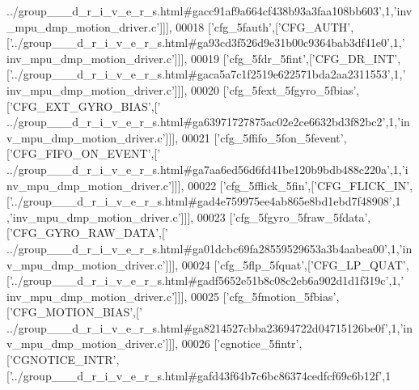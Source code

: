 \begin{DoxyCode}
{      ../group\_\_\_d\_r\_i\_v\_e\_r\_s.html#gacc91af9a664cf438b93a3faa108bb603'},1,\textcolor{stringliteral}{'inv\_mpu\_dmp\_motion\_driver.c'}]]],
00018   [\textcolor{stringliteral}{'cfg\_5fauth'},[\textcolor{stringliteral}{'CFG\_AUTH'},[\textcolor{stringliteral}{'../group\_\_\_d\_r\_i\_v\_e\_r\_s.html#ga93cd3f526d9e31b00c9364bab3df41e0'},1,\textcolor{stringliteral}{'
      inv\_mpu\_dmp\_motion\_driver.c'}]]],
00019   [\textcolor{stringliteral}{'cfg\_5fdr\_5fint'},[\textcolor{stringliteral}{'CFG\_DR\_INT'},[\textcolor{stringliteral}{'../group\_\_\_d\_r\_i\_v\_e\_r\_s.html#gaca5a7c1f2519e622571bda2aa2311553'},1,\textcolor{stringliteral}{'
      inv\_mpu\_dmp\_motion\_driver.c'}]]],
00020   [\textcolor{stringliteral}{'cfg\_5fext\_5fgyro\_5fbias'},[\textcolor{stringliteral}{'CFG\_EXT\_GYRO\_BIAS'},[\textcolor{stringliteral}{'
      ../group\_\_\_d\_r\_i\_v\_e\_r\_s.html#ga63971727875ac02e2ce6632bd3f82bc2'},1,\textcolor{stringliteral}{'inv\_mpu\_dmp\_motion\_driver.c'}]]],
00021   [\textcolor{stringliteral}{'cfg\_5ffifo\_5fon\_5fevent'},[\textcolor{stringliteral}{'CFG\_FIFO\_ON\_EVENT'},[\textcolor{stringliteral}{'
      ../group\_\_\_d\_r\_i\_v\_e\_r\_s.html#ga7aa6ed56d6fd41be120b9bdb488c220a'},1,\textcolor{stringliteral}{'inv\_mpu\_dmp\_motion\_driver.c'}]]],
00022   [\textcolor{stringliteral}{'cfg\_5fflick\_5fin'},[\textcolor{stringliteral}{'CFG\_FLICK\_IN'},[\textcolor{stringliteral}{'../group\_\_\_d\_r\_i\_v\_e\_r\_s.html#gad4e759975ee4ab865e8bd1ebd7f48908'},1
      ,\textcolor{stringliteral}{'inv\_mpu\_dmp\_motion\_driver.c'}]]],
00023   [\textcolor{stringliteral}{'cfg\_5fgyro\_5fraw\_5fdata'},[\textcolor{stringliteral}{'CFG\_GYRO\_RAW\_DATA'},[\textcolor{stringliteral}{'
      ../group\_\_\_d\_r\_i\_v\_e\_r\_s.html#ga01dcbc69fa28559529653a3b4aabea00'},1,\textcolor{stringliteral}{'inv\_mpu\_dmp\_motion\_driver.c'}]]],
00024   [\textcolor{stringliteral}{'cfg\_5flp\_5fquat'},[\textcolor{stringliteral}{'CFG\_LP\_QUAT'},[\textcolor{stringliteral}{'../group\_\_\_d\_r\_i\_v\_e\_r\_s.html#gadf5652e51b8c08c2eb6a902d1d1f319c'},1,\textcolor{stringliteral}{'
      inv\_mpu\_dmp\_motion\_driver.c'}]]],
00025   [\textcolor{stringliteral}{'cfg\_5fmotion\_5fbias'},[\textcolor{stringliteral}{'CFG\_MOTION\_BIAS'},[\textcolor{stringliteral}{'
      ../group\_\_\_d\_r\_i\_v\_e\_r\_s.html#ga8214527cbba23694722d04715126be0f'},1,\textcolor{stringliteral}{'inv\_mpu\_dmp\_motion\_driver.c'}]]],
00026   [\textcolor{stringliteral}{'cgnotice\_5fintr'},[\textcolor{stringliteral}{'CGNOTICE\_INTR'},[\textcolor{stringliteral}{'../group\_\_\_d\_r\_i\_v\_e\_r\_s.html#gafd43f64b7c6bc86374cedfcf69c6b12f'},1

\end{DoxyCode}
